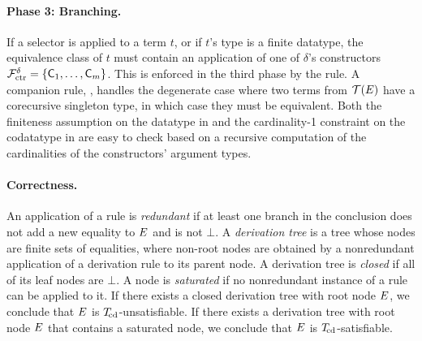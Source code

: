 \paragraph{Phase 3: Branching.}
If a selector is applied to a term $t$, or if $t$'s type is a finite datatype,
the equivalence class of $t$ must contain an application of one of
$\delta$'s constructors
$\mathcal{F}_{\mathrm{ctr}}^\delta = \{ \textsf{C}_1, \ldots, \textsf{C}_m \}$.
This is enforced in the third phase by the  rule.
A companion rule, , handles the degenerate case where two terms
from $\mathcal{T}(E)$ have a corecursive singleton type, in which case they must be
equivalent. Both the finiteness assumption on the datatype in  and
the cardinality-1 constraint on the codatatype in  are easy to
check based on a recursive computation of the cardinalities of the
constructors' argument types.

\paragraph{Correctness.}
An application of a rule is \emph{redundant} if at least one branch in the
conclusion does not add a new equality to $E$ and is not $\bot$.
A \emph{derivation tree} is a tree whose nodes are finite sets of equalities, where non-root nodes are obtained by
a nonredundant application of a derivation rule to its parent node.
A derivation tree is \emph{closed} if all of its leaf nodes are $\bot$.
A node is \emph{saturated} if no nonredundant instance of a rule can be applied to it.
%
If there exists a closed derivation tree with root node $E$, we conclude that $E$ is $T_{\!\mathrm{cd}}$-unsatisfiable.
If there exists a derivation tree with root node $E$ that contains a saturated node, we conclude that $E$ is $T_{\!\mathrm{cd}}$-satisfiable.

